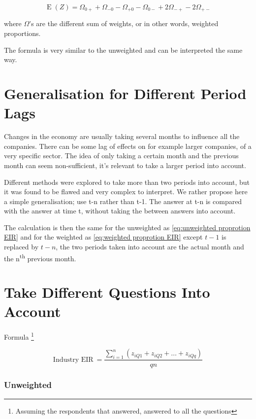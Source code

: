 \documentclass[12pt,a4paper,oneside]{book}
\DeclareMathOperator{\E}{E}
\begin{document}
\begin{equation}
    \E(Z) = \Omega_{0+} + \Omega_{-0} - \Omega_{+0} - \Omega_{0-} +2\Omega_{-+} -2\Omega_{+-} \label{eq:weighted proprotion EIR}
\end{equation}

where $\Omega$'s are the different sum of weights, or in other words, weighted proportions.

The formula is very similar to the unweighted and can be interpreted the same way.


\section{Generalisation for Different Period Lags}

Changes in the economy are usually taking several months to influence all the companies. There can be some lag of effects on for example larger companies, of a very specific sector.
The idea of only taking a certain month and the previous month can seem non-sufficient, it's relevant to take a larger period into account. 

Different methods were explored to take more than two periods into account, but it was found to be flawed and very complex to interpret.
We rather propose here a simple generalisation; use t-n rather than t-1. 
The answer at t-n is compared with the answer at time t, without taking the between answers into account.

The calculation is then the same for the unweighted as \autoref{eq:unweighted proprotion EIR} and for the weighted as \autoref{eq:weighted proprotion EIR} except $t-1$ is replaced by $t-n$, the two periods taken into account are the actual month and the n\textsuperscript{th} previous month.


\section{Take Different Questions Into Account}

Formula \footnote{Assuming the respondents that answered, answered to all the questions}

\begin{equation}
    \mbox{Industry EIR}\ = \frac{\sum_{i=1}^n \left(z_{i Q1} + z_{i Q2} + \ldots + z_{i Qq} \right)}{qn}
\end{equation}



\subsubsection{Unweighted}
\end{document}
